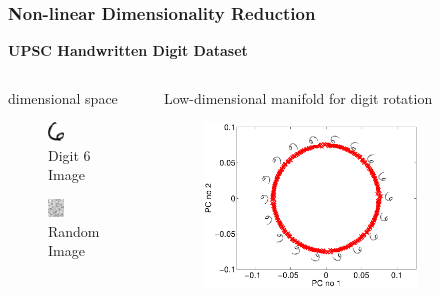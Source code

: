 \documentclass[10pt]{beamer}
\begin{document}
  \begin{frame}
  \frametitle{Non-linear Dimensionality Reduction}

  \begin{center}
    \textbf{UPSC Handwritten Digit Dataset}
  \end{center}

  \begin{columns}[t]
    \begin{column}[t]{0.3\textwidth}
       dimensional space
      \begin{figure}
        \centering
        \caption*{Digit 6 Image}
        \includegraphics[width=0.3\textwidth]{digitIm1.png}
      \end{figure}
      \begin{figure}
        \centering
        \caption*{Random Image}
        \includegraphics[width=0.3\textwidth]{digitIm2.png}
      \end{figure}
    \end{column}
    \begin{column}{0.6\textwidth}
      \centering
      Low-dimensional manifold for digit rotation
      \begin{figure}
        \centering
        \includegraphics[width=0.8\textwidth]{pca1.png}
      \end{figure}
    \end{column}
  \end{columns}

  \end{frame}
\end{document}

